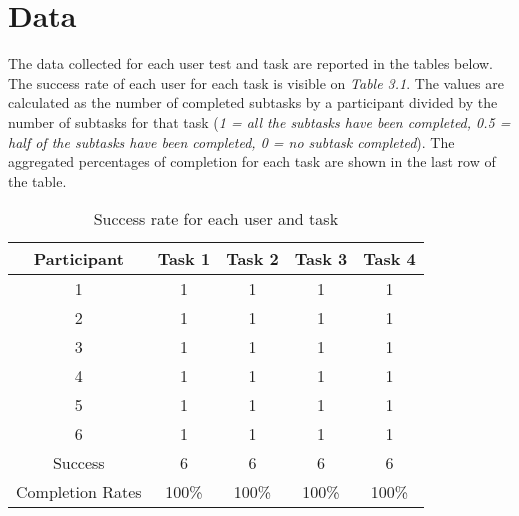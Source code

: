 \documentclass[../../UsabilityReport.tex]{subfiles}
\begin{document}
\section{Data}
	The data collected for each user test and task are reported in the tables below. The success rate of each user for each task is visible on \textit{Table 3.1}. The values are calculated as the number of completed subtasks by a participant divided by the number of subtasks for that task (\textit{1 = all the subtasks have been completed, 0.5 = half of the subtasks have been completed, 0 = no subtask completed}). The aggregated percentages of completion for each task are shown in the last row of the table.

	\begin{table}[htb]
		\caption{Success rate for each user and task}
		\centering
		\begin{tabular}{ccccc}
			\hline
			\multicolumn{1}{|c|}{\textbf{Participant}}     & \multicolumn{1}{l|}{\textbf{Task 1}} & \multicolumn{1}{l|}{\textbf{Task 2}} & \multicolumn{1}{l|}{\textbf{Task 3}} & \multicolumn{1}{l|}{\textbf{Task 4}} \\ \hline
			\multicolumn{1}{|c|}{1}              & \multicolumn{1}{c|}{1}      & \multicolumn{1}{c|}{1}      & \multicolumn{1}{c|}{1}      & \multicolumn{1}{c|}{1}      \\ \hline
			\multicolumn{1}{|c|}{2}              & \multicolumn{1}{c|}{1}      & \multicolumn{1}{c|}{1}      & \multicolumn{1}{c|}{1}      & \multicolumn{1}{c|}{1}      \\ \hline
			\multicolumn{1}{|c|}{3}              & \multicolumn{1}{c|}{1}      & \multicolumn{1}{c|}{1}      & \multicolumn{1}{c|}{1}      & \multicolumn{1}{c|}{1}      \\ \hline
			\multicolumn{1}{|c|}{4}              & \multicolumn{1}{c|}{1}      & \multicolumn{1}{c|}{1}      & \multicolumn{1}{c|}{1}      & \multicolumn{1}{c|}{1}      \\ \hline
			\multicolumn{1}{|c|}{5}              & \multicolumn{1}{c|}{1}      & \multicolumn{1}{c|}{1}      & \multicolumn{1}{c|}{1}      & \multicolumn{1}{c|}{1}      \\ \hline
			\multicolumn{1}{|c|}{6}              & \multicolumn{1}{c|}{1}      & \multicolumn{1}{c|}{1}      & \multicolumn{1}{c|}{1}      & \multicolumn{1}{c|}{1}      \\ \hline
			\multicolumn{1}{|c|}{Success}        & \multicolumn{1}{c|}{6}      & \multicolumn{1}{c|}{6}      & \multicolumn{1}{c|}{6}      & \multicolumn{1}{c|}{6}      \\ \hline
			\multicolumn{1}{p{27.5mm}}{Completion Rates} & 100\%                       & 100\%                       & 100\%                       & 100\%                       \\
		\end{tabular}
	\end{table}
\end{document}
